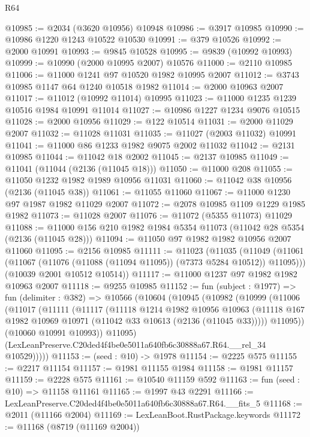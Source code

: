 \begin{lexlean}{R64}
\begin{coremodule}
@10985 := @2034 (@3620 @10956) @10948
@10986 := @3917 @10985
@10990 := @10986 @1220 @1243 @10522 @10530
@10991 := @379 @10526
@10992 := @2000 @10991
@10993 := @9845 @10528
@10995 := @9839 (@10992 @10993)
@10999 := @10990 (@2000 @10995 @2007) @10576
@11000 := @2110 @10985
@11006 := @11000 @1241 @97 @10520 @1982 @10995 @2007
@11012 := @3743 @10985 @1147 @64 @1240 @10518 @1982
@11014 := @2000 @10963 @2007
@11017 := @11012 (@10992 @11014) @10995
@11023 := @11000 @1235 @1239 @10516 @1984 @10991 @11014
@11027 := @10986 @1227 @1234 @9076 @10515
@11028 := @2000 @10956
@11029 := @122 @10514
@11031 := @2000 @11029 @2007
@11032 := @11028 @11031
@11035 := @11027 (@2003 @11032) @10991
@11041 := @11000 @86 @1233 @1982 @9075 @2002 @11032
@11042 := @2131 @10985
@11044 := @11042 @18 @2002
@11045 := @2137 @10985
@11049 := @11041 (@11044 (@2136 (@11045 @18)))
@11050 := @11000 @208
@11055 := @11050 @1232 @1982 @1989 @10956 @11031
@11060 := @11042 @38 @10956 (@2136 (@11045 @38))
@11061 := @11055 @11060
@11067 := @11000 @1230 @97 @1987 @1982 @11029 @2007
@11072 := @2078 @10985 @1109 @1229 @1985 @1982
@11073 := @11028 @2007
@11076 := @11072 (@5355 @11073) @11029
@11088 := @11000 @156 @210 @1982 @1984 @5354 @11073 (@11042 @28 @5354 (@2136 (@11045 @28)))
@11094 := @11050 @97 @1982 @1982 @10956 @2007 @11060
@11095 := @2156 @10985
@11111 := @11023
    (@11035
      (@11049 (@11061 (@11067 (@11076 (@11088 (@11094 @11095)) (@7373 @5284 @10512)) @11095)))
      (@10039 @2001 @10512 @10514))
@11117 := @11000 @1237 @97 @1982 @1982 @10963 @2007
@11118 := @9255 @10985
@11152 := fun (subject : @1977) =>
  fun (delimiter : @382) =>
  @10566
    (@10604
      (@10945
        (@10982
          (@10999
            (@11006
              (@11017
                (@11111
                  (@11117
                    (@11118
                      @1214
                      @1982
                      @10956
                      @10963
                      (@11118 @167 @1982 @10969 @10971 (@11042 @33 @10613 (@2136 (@11045 @33)))))
                    @11095))
                (@10060 @10991 @10993))
              @11095)
            (LexLeanPreserve.C20ded4f4be0e5011a640fb6c30888a67.R64.__rel_34 @10529)))))
@11153 := (seed : @10) -> @1978
@11154 := @2225 @575
@11155 := @2217 @11154
@11157 := @1981 @11155 @1984
@11158 := @1981 @11157
@11159 := @2228 @575
@11161 := @10540 @11159 @592
@11163 := fun (seed : @10) => @11158 @11161
@11165 := @1997 @43 @2291
@11166 := LexLeanPreserve.C20ded4f4be0e5011a640fb6c30888a67.R64.__fits_5
@11168 := @2011 (@11166 @2004)
@11169 := LexLeanBoot.RustPackage.keywords
@11172 := @11168 (@8719 (@11169 @2004))

\end{coremodule}
\end{lexlean}
